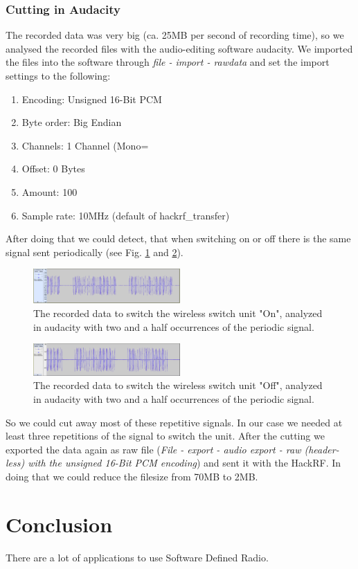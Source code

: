 \documentclass[conference]{IEEEtran}
\begin{document}
\subsubsection{Cutting in Audacity}
The recorded data was very big (ca. 25MB per second of recording time), so we analysed the recorded files with the audio-editing software audacity. We imported the files into the software through \textit{file - import - rawdata} and set the import settings to the following:

\begin{enumerate}
	\item Encoding: Unsigned 16-Bit PCM
	\item Byte order: Big Endian
	\item Channels: 1 Channel (Mono=
	\item Offset: 0 Bytes
	\item Amount: 100%
	\item Sample rate: 10MHz (default of hackrf\_transfer)
\end{enumerate}
\bigbreak
After doing that we could detect, that when switching on or off there is the same signal sent periodically (see Fig. \ref{fig:audacity_on} and \ref{fig:audacity_off}). 

\begin{figure}[H]
	\centering
	\includegraphics[width=0.5\textwidth]{audacity_received_on}
	\caption{The recorded data to switch the wireless switch unit "On", analyzed in audacity with two and a half occurrences of the periodic signal.}
	\label{fig:audacity_on}
\end{figure}

\begin{figure}[H]
	\centering
	\includegraphics[width=0.5\textwidth]{audacity_received_off}
	\caption{The recorded data to switch the wireless switch unit "Off", analyzed in audacity with two and a half occurrences of the periodic signal.}
	\label{fig:audacity_off}
\end{figure}

So we could cut away most of these repetitive signals. In our case we needed at least three repetitions of the signal to switch the unit. After the cutting we exported the data again as raw file (\textit{File - export - audio export - raw (header-less) with the unsigned 16-Bit PCM encoding}) and sent it with the HackRF. In doing that we could reduce the filesize from 70MB to 2MB.

\section{Conclusion}
There are a lot of applications to use Software Defined Radio. 



\end{document}
